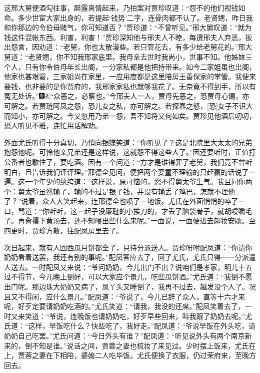 这邢大舅便酒勾往事，醉露真情起来，乃拍案对贾珍叹道：“怨不的他们视钱如命。多少世宦大家出身的，若提起‘钱势’二字，连骨肉都不认了。老贤甥，昨日我和你那边的令伯母赌气，你可知道否？”贾珍道：“不曾听见。”邢大舅叹道：“就为钱这件混帐东西。利害，利害！”贾珍深知他与邢夫人不睦，每遭邢夫人弃恶，扳出怨言，因劝道：“老舅，你也太散漫些。若只管花去，有多少给老舅花的。”邢大舅道：“老贤甥，你不知我邢家底里。我母亲去世时我尚小，世事不知。他姊妹三个人，只有你令伯母年长出阁，一分家私都是他把持带来。如今二家姐虽也出阁，他家也甚艰窘，三家姐尚在家里，一应用度都是这里陪房王善保家的掌管。我便来要钱，也非要的是你贾府的，我邢家家私也就够我花了。无奈竟不得到手，所以有冤无处诉。”{\includegraphics[width=3mm]{../Images/00004}\includegraphics[width=3mm]{../Images/00012}\footnotesize \kaishu “众恶之，必察也。”今邢夫人一人，贾母先恶之，恐贾母心偏，亦可解之。若贾琏阿凤之怨，恐儿女之私，亦可解之。若探春之怒，{[}恐{]}女子不识大而知小，亦可解之。今又忽用乃弟一怨，吾不知将又何如矣。}贾珍见他酒后叨叨，恐人听见不雅，连忙用话解劝。

外面尤氏听得十分真切，乃悄向银蝶笑道：“你听见了？这是北院里大太太的兄弟抱怨他呢。可怜他亲兄弟还是这样说，这就怨不得这些人了。”因还要听时，正值打公番者也歇住了，要吃酒。因有一个问道：“方才是谁得罪了老舅，我们竟不曾听明白，且告诉我们评评理。”邢德全见问，便把两个娈童不理输的只赶赢的话说了一遍。这一个年少的纨绔道：“这样说，原可恼的，怨不得舅太爷生气。我且问你两个：舅太爷虽然输了，输的不过是银子钱，并没有输丢了鸡巴，怎就不理他了？”说着，众人大笑起来，连邢德全也喷了一地饭。尤氏在外面悄悄的啐了一口，骂道：“你听听，这一起子没廉耻的小挨刀的，才丢了脑袋骨子，就胡唚嚼毛了。再肏攮下黄汤去，还不知唚出些什么来呢。”一面说，一面便进去卸妆安歇。至四更时，贾珍方散，往配凤房里去了。

次日起来，就有人回西瓜月饼都全了，只待分派送人。贾珍吩咐配凤道：“你请你奶奶看着送罢，我还有别的事呢。”配凤答应去了，回了尤氏，尤氏只得一一分派遣人送去。一时配凤又来说：“爷问奶奶，今儿出门不出？说咱们是孝家，明儿十五过不得节，今儿晚上倒好，可以大家应个景儿，吃些瓜饼酒。”尤氏道：“我倒不愿出门呢。那边珠大奶奶又病了，凤丫头又睡倒了，我再不过去，越发没个人了。况且又不得闲，应什么景儿。”配凤道：“爷说了，今儿已辞了众人，直等十六才来呢，好歹定要请奶奶吃酒的。”尤氏笑道：“请我，我没的还席。”配凤笑着去了，一时又来笑道：“爷说，连晚饭也请奶奶吃，好歹早些回来，叫我跟了奶奶去呢。”尤氏道：“这样，早饭吃什么？快些吃了，我好走。”配凤道：“爷说早饭在外头吃，请奶奶自己吃罢。”尤氏问道：“今日外头有谁？”配凤道：“听见说外头有两个南京新来的，倒不知是谁。”说话之间，贾蓉之妻也梳妆了来见过。少时摆上饭来，尤氏在上，贾蓉之妻在下相陪，婆媳二人吃毕饭。尤氏便换了衣服，仍过荣府来，至晚方回去。

